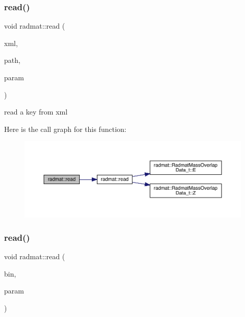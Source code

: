\subsubsection{\texorpdfstring{read()}{read()}\hspace{0.1cm}{\footnotesize\ttfamily [2/3]}}
{\footnotesize\ttfamily void radmat\+::read (\begin{DoxyParamCaption}\item[{A\+D\+A\+T\+X\+M\+L\+::\+X\+M\+L\+Reader \&}]{xml,  }\item[{const std\+::string \&}]{path,  }\item[{\mbox{\hyperlink{structradmat_1_1RadmatExtendedKeyHadronNPartIrrep__t}{Radmat\+Extended\+Key\+Hadron\+N\+Part\+Irrep\+\_\+t}} \&}]{param }\end{DoxyParamCaption})}



read a key from xml 

Here is the call graph for this function\+:
\nopagebreak
\begin{figure}[H]
\begin{center}
\leavevmode
\includegraphics[width=350pt]{d4/d83/namespaceradmat_ac62d85f3d4d74fc2ca2dc2536a8558fa_cgraph}
\end{center}
\end{figure}
\mbox{\label{namespaceradmat_a48bba8fb1d24a49efdc5eed962710717}} 
\subsubsection{\texorpdfstring{read()}{read()}\hspace{0.1cm}{\footnotesize\ttfamily [3/3]}}
{\footnotesize\ttfamily void radmat\+::read (\begin{DoxyParamCaption}\item[{A\+D\+A\+T\+I\+O\+::\+Binary\+Reader \&}]{bin,  }\item[{\mbox{\hyperlink{structradmat_1_1RadmatMassOverlapData__t}{Radmat\+Mass\+Overlap\+Data\+\_\+t}} \&}]{param }\end{DoxyParamCaption})}




